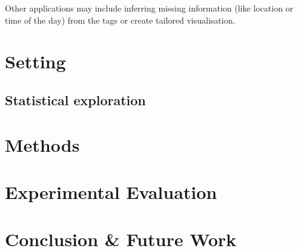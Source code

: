 Other applications may include inferring missing information (like location or
time of the day) from the tags or create tailored visualisation.
\section{Setting}


\subsection{Statistical exploration}

\clearpage

\section{Methods}

\clearpage

\section{Experimental Evaluation}

\clearpage

\section{Conclusion \& Future Work}

